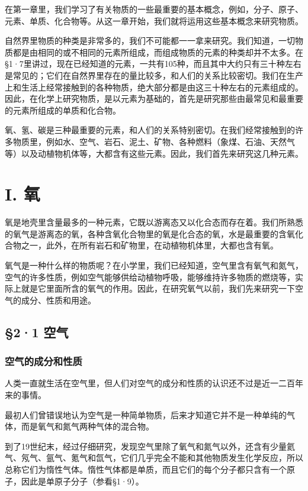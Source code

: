 在第一章里，我们学习了有关物质的一些最重要的基本概念，例如，分子、原子、元素、单质、化合物等。从这一章开始，我们就将运用这些基本概念来研究物质。

自然界里物质的种类是非常多的，我们不可能都一一拿来研究。我们知道，一切物质都是由相同的或不相同的元素所组成，而组成物质的元素的种类却并不太多。在§1·7里讲过，现在已经知道的元素，一共有105种，而且其中大约只有三十种左右是常见的；它们在自然界里存在的量比较多，和人们的关系比较密切。我们在生产上和生活上经常接触到的各种物质，绝大部分都是由这三十种左右的元素组成的。因此，在化学上研究物质，是以元素为基础的，首先是研究那些由最常见和最重要的元素所组成的单质和化合物。

氧、氢、碳是三种最重要的元素，和人们的关系特别密切。在我们经常接触到的许多物质里，例如水、空气、岩石、泥土、矿物、各种燃料（象煤、石油、天然气等）以及动植物机体等，大都含有这些元素。因此，我们首先来研究这几种元素。

\section{I. 氧}\label{i.-ux6c27}

氧是地壳里含量最多的一种元素，它既以游离态又以化合态而存在着。我们所熟悉的氧气是游离态的氧，各种含氧化合物里的氧是化合态的氧，水是最重要的含氧化合物之一，此外，在所有岩石和矿物里，在动植物机体里，大都也含有氧。

氧气是一种什么样的物质呢？在小学里，我们已经知道，空气里含有氧气和氮气，空气的许多性质，例如空气能够供给动植物呼吸，能够维持许多物质的燃烧等，实际上就是它里面所含的氧气的作用。因此，在研究氧气以前，我们先来研究一下空气的成分、性质和用途。

\subsection{§2·1 空气}

\subsubsection{空气的成分和性质}

人类一直就生活在空气里，但人们对空气的成分和性质的认识还不过是近一二百年来的事情。

最初人们曾错误地认为空气是一种简单物质，后来才知道它并不是一种单纯的气体，而是氧气和氮气两种气体的混合物。

到了19世纪末，经过仔细研究，发现空气里除了氧气和氮气以外，还含有少量氦气、氖气、氩气、氪气和氙气，它们几乎完全不能和其他物质发生化学反应，所以总称它们为惰性气体。惰性气体都是单质，而且它们的每个分子都只含有一个原子，因此是单原子分子（参看§1·9）。

